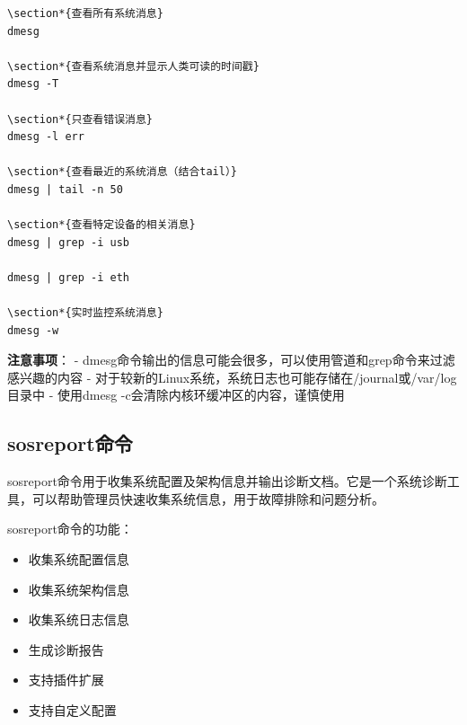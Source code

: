 \documentclass[12pt,UTF8]{ctexbook}
\begin{document}
\begin{verbatim}
\section*{查看所有系统消息}
dmesg

\section*{查看系统消息并显示人类可读的时间戳}
dmesg -T

\section*{只查看错误消息}
dmesg -l err

\section*{查看最近的系统消息（结合tail）}
dmesg | tail -n 50

\section*{查看特定设备的相关消息}
dmesg | grep -i usb

dmesg | grep -i eth

\section*{实时监控系统消息}
dmesg -w
\end{verbatim}

\textbf{注意事项}：
- dmesg命令输出的信息可能会很多，可以使用管道和grep命令来过滤感兴趣的内容
- 对于较新的Linux系统，系统日志也可能存储在/journal或/var/log目录中
- 使用dmesg -c会清除内核环缓冲区的内容，谨慎使用

\subsection{sosreport命令}
sosreport命令用于收集系统配置及架构信息并输出诊断文档。它是一个系统诊断工具，可以帮助管理员快速收集系统信息，用于故障排除和问题分析。

sosreport命令的功能：
\begin{itemize}
    \item 收集系统配置信息
    \item 收集系统架构信息
    \item 收集系统日志信息
    \item 生成诊断报告
    \item 支持插件扩展
    \item 支持自定义配置
\end{itemize}
\end{document}
